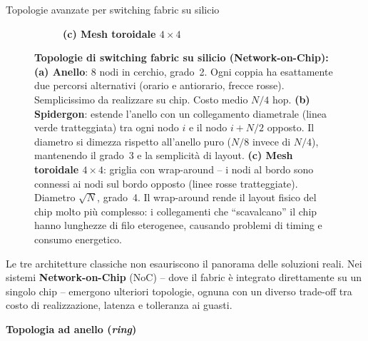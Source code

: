 \documentclass[a4paper,12pt]{report}
\begin{document}
\begin{notebox}{Topologie avanzate per switching fabric su silicio}
\begin{figure}[H]
\begin{subfigure}[t]{0.30\textwidth}
\caption*{\textbf{(c) Mesh toroidale $4{\times}4$}}
\end{subfigure}

\caption{%
    \textbf{Topologie di switching fabric su silicio (Network-on-Chip):   }
    \textbf{(a) Anello}: 8 nodi in cerchio, grado~2. Ogni coppia ha
    esattamente due percorsi alternativi (orario e antiorario, frecce
    rosse). Semplicissimo da realizzare su chip. Costo medio $N/4$ hop.
    \textbf{(b) Spidergon}: estende l'anello con un collegamento
    diametrale (linea verde tratteggiata) tra ogni nodo $i$ e il nodo
    $i + N/2$ opposto. Il diametro si dimezza rispetto all'anello puro
    ($N/8$ invece di $N/4$), mantenendo il grado~3 e la semplicità di
    layout.
    \textbf{(c) Mesh toroidale $4\times4$}: griglia con wrap-around --
    i nodi al bordo sono connessi ai nodi sul bordo opposto (linee rosse
    tratteggiate). Diametro $\sqrt{N}$, grado~4. Il wrap-around rende il
    layout fisico del chip molto più complesso: i collegamenti che
    ``scavalcano'' il chip hanno lunghezze di filo eterogenee, causando
    problemi di timing e consumo energetico.%
}
\label{fig:noc_topologies}
\end{figure}
Le tre architetture classiche non esauriscono il panorama delle soluzioni
reali. Nei sistemi \textbf{Network-on-Chip} (NoC) -- dove il fabric è
integrato direttamente su un singolo chip -- emergono ulteriori topologie,
ognuna con un diverso trade-off tra costo di realizzazione, latenza e
tolleranza ai guasti.


\vspace{0.5cm}
\textbf{Topologia ad anello (\textit{ring})}


\end{notebox}
\end{document}
